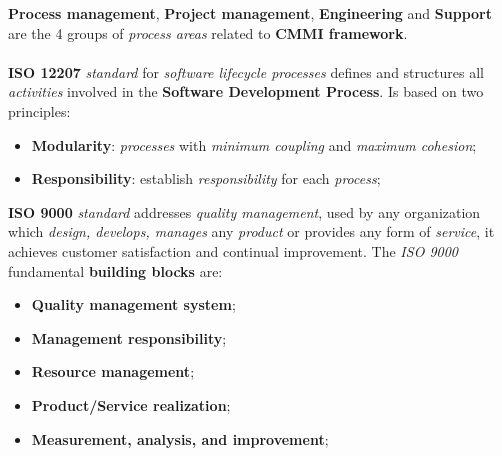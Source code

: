 \documentclass{article}
\begin{document}
\hfill \break
\textbf{Process management}, \textbf{Project management}, \textbf{Engineering} and \textbf{Support} are the 4 groups of \emph{process areas} related to \textbf{CMMI framework}. \\\\\textbf{ISO 12207} \emph{standard} for \emph{software lifecycle processes} defines and structures all \emph{activities} involved in the \textbf{Software Development Process}. Is based on two principles: 
\begin{itemize}
\item \textbf{Modularity}: \emph{processes} with \emph{minimum coupling} and \emph{maximum cohesion};
\item \textbf{Responsibility}: establish \emph{responsibility} for each \emph{process};
\end{itemize}
\pagebreak
\textbf{ISO 9000} \emph{standard} addresses \emph{quality management}, used by any organization which \emph{design, develops, manages} any \emph{product} or provi\emph{}des any form of \emph{service}, it achieves customer satisfaction and continual improvement. The \emph{ISO 9000} fundamental \textbf{building blocks} are:
\begin{itemize}
\item \textbf{Quality management system};
\item \textbf{Management responsibility};
\item \textbf{Resource management};
\item \textbf{Product/Service realization};
\item \textbf{Measurement, analysis, and improvement};
\end{itemize}
\end{document}
